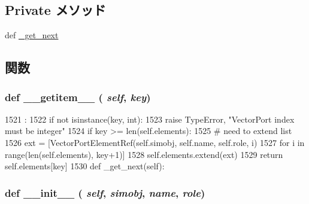 \subsection*{Private メソッド}
\begin{DoxyCompactItemize}
\item 
def \hyperlink{classm5_1_1params_1_1VectorPortRef_a8272147f66bd35474aecd93e8746004a}{\_\-get\_\-next}
\end{DoxyCompactItemize}


\subsection{関数}
\hypertarget{classm5_1_1params_1_1VectorPortRef_a50d766f4276c3d8fe330ac8cd344a75f}{
\subsubsection[{\_\-\_\-getitem\_\-\_\-}]{\setlength{\rightskip}{0pt plus 5cm}def \_\-\_\-getitem\_\-\_\- ( {\em self}, \/   {\em key})}}
\label{classm5_1_1params_1_1VectorPortRef_a50d766f4276c3d8fe330ac8cd344a75f}



\begin{DoxyCode}
1521                               :
1522         if not isinstance(key, int):
1523             raise TypeError, "VectorPort index must be integer"
1524         if key >= len(self.elements):
1525             # need to extend list
1526             ext = [VectorPortElementRef(self.simobj, self.name, self.role, i)
1527                    for i in range(len(self.elements), key+1)]
1528             self.elements.extend(ext)
1529         return self.elements[key]
1530 
    def _get_next(self):
\end{DoxyCode}
\hypertarget{classm5_1_1params_1_1VectorPortRef_ac775ee34451fdfa742b318538164070e}{
\subsubsection[{\_\-\_\-init\_\-\_\-}]{\setlength{\rightskip}{0pt plus 5cm}def \_\-\_\-init\_\-\_\- ( {\em self}, \/   {\em simobj}, \/   {\em name}, \/   {\em role})}}
\label{classm5_1_1params_1_1VectorPortRef_ac775ee34451fdfa742b318538164070e}



